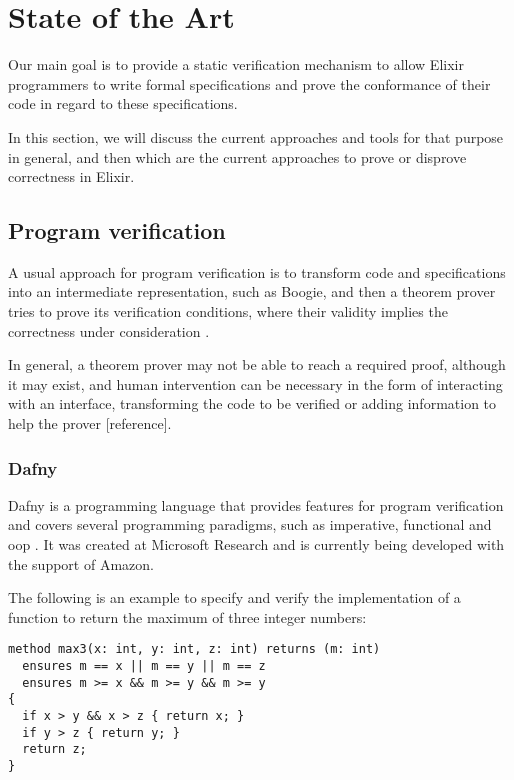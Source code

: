 \chapter{State of the Art}
\label{cap:stateOfTheArt}

Our main goal is to provide a static verification mechanism to allow Elixir
programmers to write formal specifications and prove the conformance of their 
code in regard to these specifications. 

In this section, we will discuss the current approaches and tools for that purpose
in general, and then which are the current approaches to prove or disprove correctness
in Elixir.

\section{Program verification}

A usual approach for program verification is to transform code and specifications into
an intermediate representation, such as Boogie, and then a theorem prover
tries to prove its verification conditions, where their validity implies the correctness
under consideration \citep{Boogie2}.

In general, a theorem prover may not be able to reach a required proof, although it may exist,
and human intervention can be necessary in the form of interacting with an interface, transforming
the code to be verified or adding information to help the prover [reference].

\subsection{Dafny}

Dafny is a programming language that provides features for program verification and 
covers several programming paradigms, such as imperative, functional and \gls{oop} \citep{DafnyManual}. 
It was created at Microsoft Research and is currently being developed with the support of Amazon.

The following is an example to specify and verify the implementation of a function to return 
the maximum of three integer numbers:

\begin{verbatim}
method max3(x: int, y: int, z: int) returns (m: int)
  ensures m == x || m == y || m == z
  ensures m >= x && m >= y && m >= y
{
  if x > y && x > z { return x; }
  if y > z { return y; }
  return z;
}
\end{verbatim}

